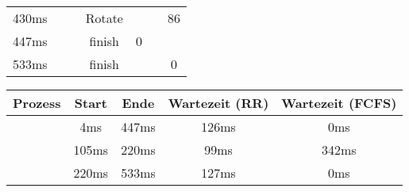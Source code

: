 \begin{frame}
\begin{table}[]
\begin{adjustbox}{width=0.8\textwidth}
\begin{tabular}{c|cc|c|ccc}
                430ms                                   & \PZero{}                                        & \PTwo{}         & \alert{Rotate}                 &                                       &                  & \alert{86}       \\
                447ms                                   & \PTwo{}                                         &                 & \PZero{} finish                & \alert{0}                             &                  &                  \\
                533ms                                   &                                                 &                 & \PTwo{} finish                 &                                       &                  & \alert{0}
            \end{tabular}
        \end{adjustbox}
    \end{table}

    \pause

    \begin{table}[]
        \begin{tabular}{c|c|c|c|c}
            \textbf{Prozess} & \textbf{Start} & \textbf{Ende} & \textbf{Wartezeit (RR)} & \textbf{Wartezeit (FCFS)} \\
            \hline
            \PZero{}         & 4ms            & 447ms         & 126ms                   & 0ms                       \\
            \POne{}          & 105ms          & 220ms         & 99ms                    & 342ms                     \\
            \PTwo{}          & 220ms          & 533ms         & 127ms                   & 0ms
        \end{tabular}
    \end{table}

\end{frame}
